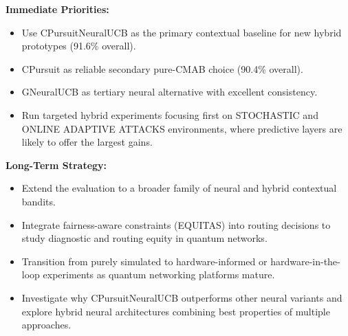 \documentclass[12pt,a4paper]{article}
\begin{document}
\textbf{Immediate Priorities:}
\begin{itemize}
\item Use CPursuitNeuralUCB as the primary contextual baseline for new hybrid prototypes (91.6\% overall).
\item CPursuit as reliable secondary pure-CMAB choice (90.4\% overall).
\item GNeuralUCB as tertiary neural alternative with excellent consistency.
\item Run targeted hybrid experiments focusing first on STOCHASTIC and ONLINE ADAPTIVE ATTACKS environments, where predictive layers are likely to offer the largest gains.
\end{itemize}

\textbf{Long-Term Strategy:}
\begin{itemize}
\item Extend the evaluation to a broader family of neural and hybrid contextual bandits.
\item Integrate fairness-aware constraints (EQUITAS) into routing decisions to study diagnostic and routing equity in quantum networks.
\item Transition from purely simulated to hardware-informed or hardware-in-the-loop experiments as quantum networking platforms mature.
\item Investigate why CPursuitNeuralUCB outperforms other neural variants and explore hybrid neural architectures combining best properties of multiple approaches.
\end{itemize}
\end{document}
